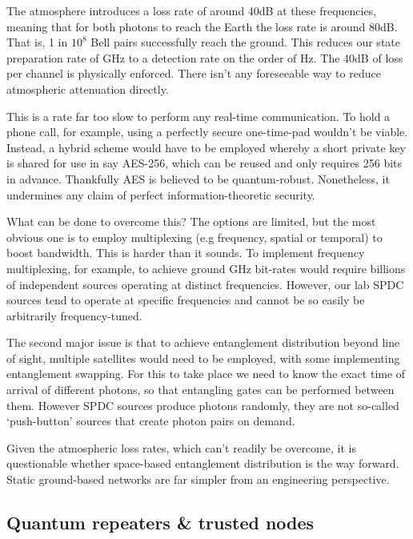 The atmosphere introduces a loss rate of around 40dB at these frequencies, meaning that for both photons to reach the Earth the loss rate is around 80dB. That is, 1 in $10^8$ Bell pairs successfully reach the ground. This reduces our state preparation rate of GHz to a detection rate on the order of Hz. The 40dB of loss per channel is physically enforced. There isn't any foreseeable way to reduce atmospheric attenuation directly.

This is a rate far too slow to perform any real-time communication. To hold a phone call, for example, using a perfectly secure one-time-pad wouldn't be viable. Instead, a hybrid scheme would have to be employed whereby a short private key is shared for use in say AES-256, which can be reused and only requires 256 bits in advance. Thankfully AES is believed to be quantum-robust. Nonetheless, it undermines any claim of perfect information-theoretic security.

What can be done to overcome this? The options are limited, but the most obvious one is to employ multiplexing (e.g frequency, spatial or temporal) to boost bandwidth. This is harder than it sounds. To implement frequency multiplexing, for example, to achieve ground GHz bit-rates would require billions of independent sources operating at distinct frequencies. However, our lab SPDC sources tend to operate at specific frequencies and cannot be so easily be arbitrarily frequency-tuned.

The second major issue is that to achieve entanglement distribution beyond line of sight, multiple satellites would need to be employed, with some implementing entanglement swapping. For this to take place we need to know the exact time of arrival of different photons, so that entangling gates can be performed between them. However SPDC sources produce photons randomly, they are not so-called `push-button' sources that create photon pairs on demand.

Given the atmospheric loss rates, which can't readily be overcome, it is questionable whether space-based entanglement distribution is the way forward. Static ground-based networks are far simpler from an engineering perspective.

\subsection{Quantum repeaters \& trusted nodes} \label{quantum-repeaters-trusted-nodes}

